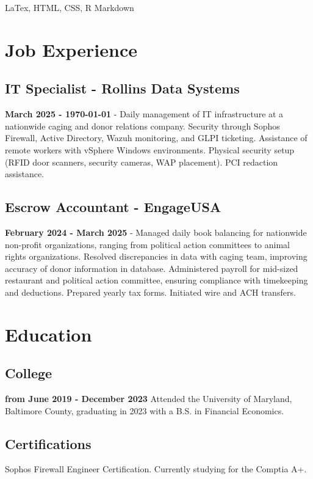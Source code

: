 \documentclass{article}
\begin{document}
LaTex, HTML, CSS, R Markdown


\section{Job Experience}

\subsection{IT Specialist - Rollins Data Systems}
\textbf{March 2025 - \monthyeardate\today} - Daily management of IT infrastructure at a nationwide caging and donor relations company. Security through Sophos Firewall, Active Directory, Wazuh monitoring, and GLPI ticketing. Assistance of remote workers with vSphere Windows environments. Physical security setup (RFID door scanners, security cameras, WAP placement). PCI redaction assistance. 

\subsection{Escrow Accountant - EngageUSA}
\textbf{February 2024 - March 2025} - Managed daily book balancing for nationwide non-profit organizations, ranging from political action committees to animal rights organizations. Resolved discrepancies in data with caging team, improving accuracy of donor information in database. Administered payroll for mid-sized restaurant and political action committee, ensuring compliance with timekeeping and deductions. Prepared yearly tax forms. Initiated wire and ACH transfers.  

\section{Education}

\subsection{College} \textbf{from June 2019 - December 2023}
Attended the University of Maryland, Baltimore County, graduating in 2023 with a B.S. in Financial Economics. 

\subsection{Certifications}

Sophos Firewall Engineer Certification. Currently studying for the Comptia A+. 
\end{document}
